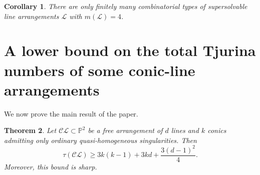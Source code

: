 \documentclass[11pt]{article}
\theoremstyle{plain}
\newtheorem{theorem}{Theorem}[section]
\newtheorem{corollary}[theorem]{Corollary}
\theoremstyle{definition}
\theoremstyle{remark}
\begin{document}
\begin{corollary}
There are only finitely many combinatorial types of supersolvable line arrangements $\mathcal{L}$ with $m(\mathcal{L})=4$.
\end{corollary}


\section{A lower bound on the total Tjurina numbers of some conic-line arrangements}
We now prove the main result of the paper.
\begin{theorem}
\label{main}
Let $\mathcal{CL} \subset \mathbb{P}^{2}$ be a free arrangement of $d$ lines and $k$ conics admitting only ordinary quasi-homogeneous singularities. Then
$$\tau(\mathcal{CL}) \geq 3k(k-1) + 3kd + \frac{3(d-1)^2}{4}.$$
Moreover, this bound is sharp.
\end{theorem}
\end{document}

